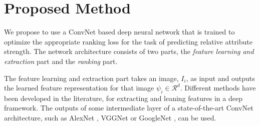 

\section{Proposed Method}
\label{sec.3}

We propose to use a ConvNet based deep neural network that is trained to optimize the appropriate ranking loss for the task of predicting relative attribute strength. The network architecture consists of two parts, the \textit{feature learning and extraction} part and the \textit{ranking} part.

The feature learning and extraction part takes an image, $I_i$, as input and outputs the learned feature representation for that image $\psi_i \in \mathcal{R}^d$.
Different methods have been developed in the literature, for extracting and leaning features in a deep framework. The outputs of some intermediate layer of a state-of-the-art ConvNet architecture, such as AlexNet \cite{krizhevski}, VGGNet \cite{verydeep} or GoogleNet \cite{googlenet},
can be used.


